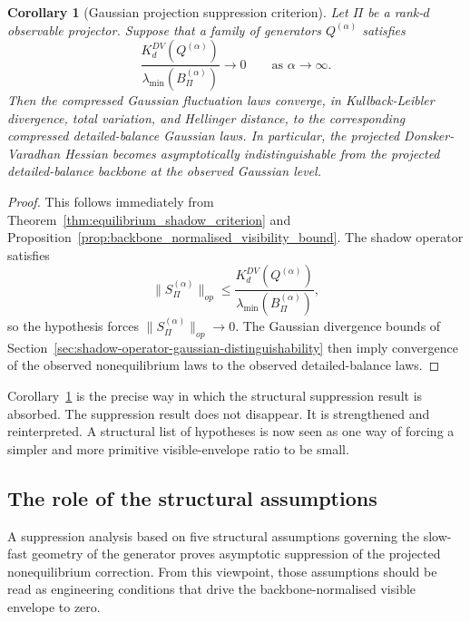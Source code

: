 \documentclass[11pt,a4paper]{article}
\numberwithin{equation}{section}
\theoremstyle{thmcompact}
\newtheorem{corollary}[theorem]{Corollary}
\theoremstyle{remark}
\begin{document}
\begin{corollary}[Gaussian projection suppression criterion]
\label{thm:projection_suppression_as_corollary}
Let \(\Pi\) be a rank-\(d\) observable projector. Suppose that a family of generators \(Q^{(\alpha)}\) satisfies
\begin{equation}
\frac{K_d^{DV}(Q^{(\alpha)})}{\lambda_{\min}(B_\Pi^{(\alpha)})}\to 0
\qquad\text{as }\alpha\to\infty.
\end{equation}
Then the compressed Gaussian fluctuation laws converge, in Kullback-Leibler divergence, total variation, and Hellinger distance, to the corresponding compressed detailed-balance Gaussian laws. In particular, the projected Donsker-Varadhan Hessian becomes asymptotically indistinguishable from the projected detailed-balance backbone at the observed Gaussian level.
\end{corollary}

\begin{proof}
This follows immediately from Theorem~\ref{thm:equilibrium_shadow_criterion} and Proposition~\ref{prop:backbone_normalised_visibility_bound}. The shadow operator satisfies
\begin{equation}
\|S_\Pi^{(\alpha)}\|_{op}
\le
\frac{K_d^{DV}(Q^{(\alpha)})}{\lambda_{\min}(B_\Pi^{(\alpha)})},
\end{equation}
so the hypothesis forces \(\|S_\Pi^{(\alpha)}\|_{op}\to 0\). The Gaussian divergence bounds of Section~\ref{sec:shadow-operator-gaussian-distinguishability} then imply convergence of the observed nonequilibrium laws to the observed detailed-balance laws.
\end{proof}

Corollary~\ref{thm:projection_suppression_as_corollary} is the precise way in which the structural suppression result is absorbed. The suppression result does not disappear. It is strengthened and reinterpreted. A structural list of hypotheses is now seen as one way of forcing a simpler and more primitive visible-envelope ratio to be small.

\subsection{The role of the structural assumptions}

A suppression analysis based on five structural assumptions governing the slow-fast geometry of the generator proves asymptotic suppression of the projected nonequilibrium correction. From this viewpoint, those assumptions should be read as engineering conditions that drive the backbone-normalised visible envelope to zero.
\end{document}
